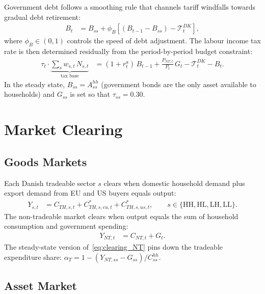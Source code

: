\documentclass[12pt,a4paper]{article}
\begin{document}
Government debt follows a smoothing rule that channels tariff windfalls towards gradual debt retirement:
\begin{align}
    B_t &= B_{ss} + \phi_B\!\left[(B_{t-1} - B_{ss}) - \mathcal{T}^{DK}_t\right],
    \label{eq:debt}
\end{align}
where $\phi_B \in (0,1)$ controls the speed of debt adjustment. The labour income tax rate is then determined residually from the period-by-period budget constraint:
\begin{align}
    \tau_t \cdot \underbrace{\sum_s w_{s,t}\,N_{s,t}}_{\text{tax base}}
    &= (1+r^a_t)\,B_{t-1} + \frac{P_{NT,t}}{P_t}\,G_t - \mathcal{T}^{DK}_t - B_t.
    \label{eq:govt_bc}
\end{align}
In the steady state, $B_{ss} = A^{hh}_{ss}$ (government bonds are the only asset available to households) and $G_{ss}$ is set so that $\tau_{ss} = 0.30$.


\section{Market Clearing}
\label{sec:mktclearing}

\subsection{Goods Markets}

Each Danish tradeable sector $s$ clears when domestic household demand plus export demand from EU and US buyers equals output:
\begin{align}
    Y_{s,t} &= C_{TH,s,t} + C^*_{TH,s,eu,t} + C^*_{TH,s,us,t},
    \qquad s \in \{\text{HH},\text{HL},\text{LH},\text{LL}\}.
    \label{eq:clearing_T}
\end{align}
The non-tradeable market clears when output equals the sum of household consumption and government spending:
\begin{align}
    Y_{NT,t} &= C_{NT,t} + G_t.
    \label{eq:clearing_NT}
\end{align}
The steady-state version of~\eqref{eq:clearing_NT} pins down the tradeable expenditure share: $\alpha_T = 1 - (Y_{NT,ss} - G_{ss})/C^{hh}_{ss}$.

\subsection{Asset Market}
\end{document}
